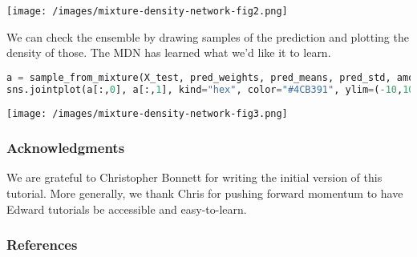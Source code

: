 \texttt{[image: /images/mixture-density-network-fig2.png]}

We can check the ensemble by drawing samples of the prediction and
plotting the density of those. The MDN has learned what we'd like it
to learn.

\begin{lstlisting}[language=Python]
a = sample_from_mixture(X_test, pred_weights, pred_means, pred_std, amount=len(X_test))
sns.jointplot(a[:,0], a[:,1], kind="hex", color="#4CB391", ylim=(-10,10), xlim=(-14,14))
\end{lstlisting}

\texttt{[image: /images/mixture-density-network-fig3.png]}

\subsubsection{Acknowledgments}

We are grateful to Christopher Bonnett for writing the initial version
of this tutorial. More generally, we thank Chris for pushing forward
momentum to have Edward tutorials be accessible and easy-to-learn.

\subsubsection{References}\label{references}
